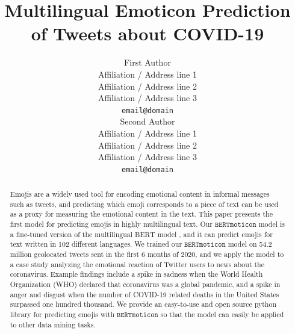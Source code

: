 \documentclass[11pt]{article}
\title{Multilingual Emoticon Prediction of Tweets about COVID-19 \emoji{mask_photo.png}}
\author{First Author \\
  Affiliation / Address line 1 \\
  Affiliation / Address line 2 \\
  Affiliation / Address line 3 \\
  {\tt email@domain} \\\And
  Second Author \\
  Affiliation / Address line 1 \\
  Affiliation / Address line 2 \\
  Affiliation / Address line 3 \\
  {\tt email@domain} \\}
\date{}
\newcommand{\bertmoji}{\texttt{BERTmoticon}}
\newcommand{\bert}{\text{multilingual BERT}}
\begin{document}
\maketitle
\begin{abstract}
    Emojis are a widely used tool for encoding emotional content in informal messages such as tweets,
    and predicting which emoji corresponds to a piece of text can be used as a proxy for measuring the emotional content in the text.
    This paper presents the first model for predicting emojis in highly multilingual text.
    Our $\bertmoji$ model is a fine-tuned version of the $\bert$ model \citep{devlin2018bert},
    and it can predict emojis for text written in 102 different languages.
    We trained our $\bertmoji$ model on 54.2 million geolocated tweets sent in the first 6 months of 2020,
    and we apply the model to a case study analyzing the emotional reaction of Twitter users to news about the coronavirus.
    Example findings include a spike in sadness when the World Health Organization (WHO) declared that coronavirus was a global pandemic,
    and a spike in anger and disgust when the number of COVID-19 related deaths in the United States surpassed one hundred thousand.
    We provide an easy-to-use and open source python library for predicting emojis with $\bertmoji$ so that the model can easily be applied to other data mining tasks.
\end{abstract}

%
% 
\end{document}
